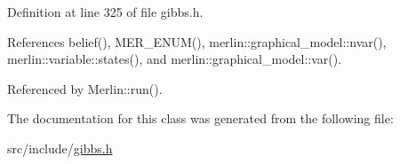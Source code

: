 Definition at line 325 of file gibbs.\+h.



References belief(), M\+E\+R\+\_\+\+E\+N\+U\+M(), merlin\+::graphical\+\_\+model\+::nvar(), merlin\+::variable\+::states(), and merlin\+::graphical\+\_\+model\+::var().



Referenced by Merlin\+::run().



The documentation for this class was generated from the following file\+:\begin{DoxyCompactItemize}
\item 
src/include/\hyperlink{gibbs_8h}{gibbs.\+h}\end{DoxyCompactItemize}
